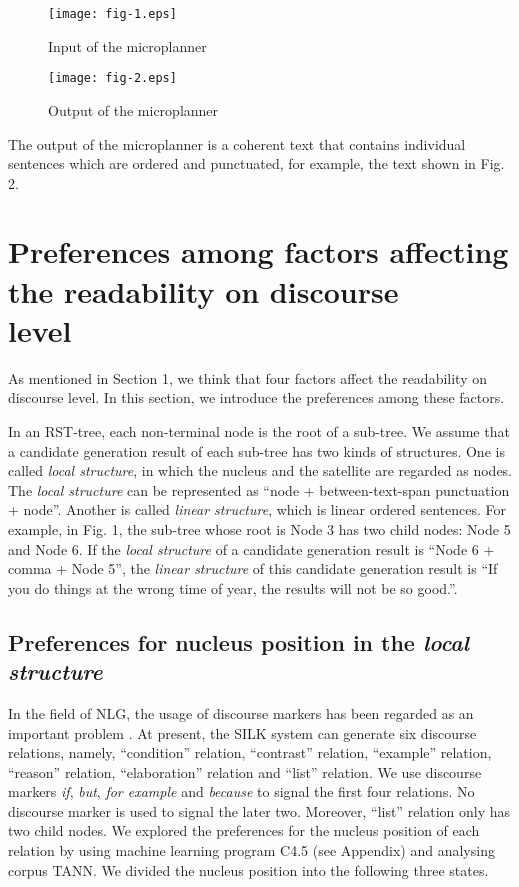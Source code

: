 \documentclass[english]{jnlp_1.2.0}
\begin{document}
\begin{figure}[t]
\begin{center}
\texttt{[image: fig-1.eps]}
\caption{Input of the microplanner}
\vspace{20pt}
\texttt{[image: fig-2.eps]}
\end{center}
\caption{Output of the microplanner}
\end{figure}


The output of the microplanner is a coherent text that contains individual 
sentences which are ordered and punctuated, for example, the text shown 
in Fig. 2.


\section{Preferences among factors affecting the readability on discourse \\\hspace{18pt}level}

As mentioned in Section 1, we think that four factors affect the
readability on discourse level. In this section, we introduce the
preferences among these factors.

In an RST-tree, each non-terminal node is the root of a sub-tree. 
We assume that a candidate generation result of 
each sub-tree has two kinds of structures. One is called 
\textit{local structure}, in which the nucleus and the satellite 
are regarded as nodes. The \textit{local structure} can be 
represented as ``node + between-text-span punctuation + node''. 
Another is called \textit{linear structure}, which is linear 
ordered sentences. For example, in Fig. 1, the sub-tree 
whose root is Node 3 has two child nodes: Node 5 and Node 6. 
If the \textit{local structure} of a candidate generation result 
is ``Node 6 + comma + Node 5'', the \textit{linear structure} 
of this candidate generation result is ``If you do things at the
wrong time of year, the results will not be so good.''.


\subsection{Preferences for nucleus position in the \textit{local structure}}

In the field of NLG, the usage of discourse markers has been regarded as an 
important problem \cite{Elhadad90,Moser95,Eugenio97}. 
At present, the SILK system can generate six discourse relations, namely, 
``condition'' relation, ``contrast'' relation, ``example'' relation, 
``reason'' relation, ``elaboration'' relation and ``list'' relation. 
We use discourse markers \textit{if}, \textit{but}, \textit{for example} and
\textit{because} to signal the first four relations. No discourse marker is
used to signal the later two. Moreover, ``list'' relation only has
two child nodes. We explored the preferences for the nucleus position of each
relation by using machine learning program C4.5 (see Appendix) and analysing 
corpus TANN. We divided the nucleus position into the following three states. 
\end{document}
